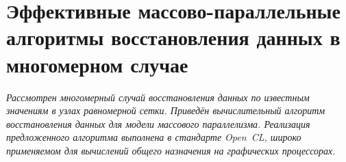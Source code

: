 


\section*{ 
Эффективные массово-параллельные 
алгоритмы восстановления данных в многомерном случае
}

\bigskip

\textit{
  Рассмотрен многомерный случай восстановления данных
  по известным значениям в узлах равномерной сетки. 
  Приведён вычислительный алгоритм восстановления данных для модели массового параллелизма.
  Реализация предложенного алгоритма выполнена в стандарте Open~CL,
  широко применяемом для вычислений общего назначения на графических процессорах.%
}







